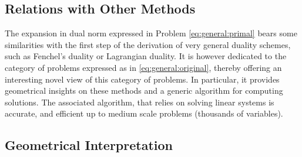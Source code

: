 \subsection{Relations with Other Methods}

The expansion in dual norm expressed in Problem \eqref{eq:general:primal} bears
some similarities with the first step of the derivation of very general duality
schemes, such as Fenchel's duality or Lagrangian duality.
It is however dedicated to the category of problems expressed as in
\eqref{eq:general:original}, thereby offering an interesting novel view of this
category of problems.
In particular, it provides geometrical insights on these methods and a generic
algorithm for computing solutions.  The associated algorithm, that relies on
solving linear systems is accurate, and efficient up to medium scale problems
(thousands of variables).

\subsection{Geometrical Interpretation}


